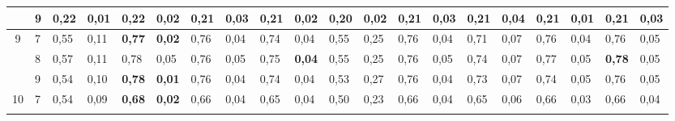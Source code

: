 \documentclass[conference]{IEEEtran}
\begin{document}
\begin{table}[]
\begin{tabular}{|cl|ll|ll|ll|ll|ll|ll|ll|ll|ll|}
		\multicolumn{1}{|c|}{}                    & 9 & \multicolumn{1}{l|}{\textbf{0,22}} & 0,01          & \multicolumn{1}{l|}{0,22}          & 0,02          & \multicolumn{1}{l|}{0,21}          & 0,03          & \multicolumn{1}{l|}{0,21} & 0,02          & \multicolumn{1}{l|}{0,20}                 & 0,02          & \multicolumn{1}{l|}{0,21}          & 0,03          & \multicolumn{1}{l|}{0,21}          & 0,04          & \multicolumn{1}{l|}{0,21}          & \textbf{0,01} & \multicolumn{1}{l|}{0,21}          & 0,03          \\ \hline
		\multicolumn{1}{|c|}{\multirow{3}{*}{9}}  & 7 & \multicolumn{1}{l|}{0,55}          & 0,11          & \multicolumn{1}{l|}{\textbf{0,77}} & \textbf{0,02} & \multicolumn{1}{l|}{0,76}          & 0,04          & \multicolumn{1}{l|}{0,74} & 0,04          & \multicolumn{1}{l|}{0,55}                 & 0,25          & \multicolumn{1}{l|}{0,76}          & 0,04          & \multicolumn{1}{l|}{0,71}          & 0,07          & \multicolumn{1}{l|}{0,76}          & 0,04          & \multicolumn{1}{l|}{0,76}          & 0,05          \\ \cline{2-20} 
		\multicolumn{1}{|c|}{}                    & 8 & \multicolumn{1}{l|}{0,57}          & 0,11          & \multicolumn{1}{l|}{0,78}          & 0,05          & \multicolumn{1}{l|}{0,76}          & 0,05          & \multicolumn{1}{l|}{0,75} & \textbf{0,04} & \multicolumn{1}{l|}{0,55}                 & 0,25          & \multicolumn{1}{l|}{0,76}          & 0,05          & \multicolumn{1}{l|}{0,74}          & 0,07          & \multicolumn{1}{l|}{0,77}          & 0,05          & \multicolumn{1}{l|}{\textbf{0,78}} & 0,05          \\ \cline{2-20} 
		\multicolumn{1}{|c|}{}                    & 9 & \multicolumn{1}{l|}{0,54}          & 0,10          & \multicolumn{1}{l|}{\textbf{0,78}} & \textbf{0,01} & \multicolumn{1}{l|}{0,76}          & 0,04          & \multicolumn{1}{l|}{0,74} & 0,04          & \multicolumn{1}{l|}{0,53}                 & 0,27          & \multicolumn{1}{l|}{0,76}          & 0,04          & \multicolumn{1}{l|}{0,73}          & 0,07          & \multicolumn{1}{l|}{0,74}          & 0,05          & \multicolumn{1}{l|}{0,76}          & 0,05          \\ \hline
		\multicolumn{1}{|c|}{\multirow{3}{*}{10}} & 7 & \multicolumn{1}{l|}{0,54}          & 0,09          & \multicolumn{1}{l|}{\textbf{0,68}} & \textbf{0,02} & \multicolumn{1}{l|}{0,66}          & 0,04          & \multicolumn{1}{l|}{0,65} & 0,04          & \multicolumn{1}{l|}{0,50}                 & 0,23          & \multicolumn{1}{l|}{0,66}          & 0,04          & \multicolumn{1}{l|}{0,65}          & 0,06          & \multicolumn{1}{l|}{0,66}          & 0,03          & \multicolumn{1}{l|}{0,66}          & 0,04          \\ \cline{2-20} 

\end{tabular}
\end{table}
\end{document}
